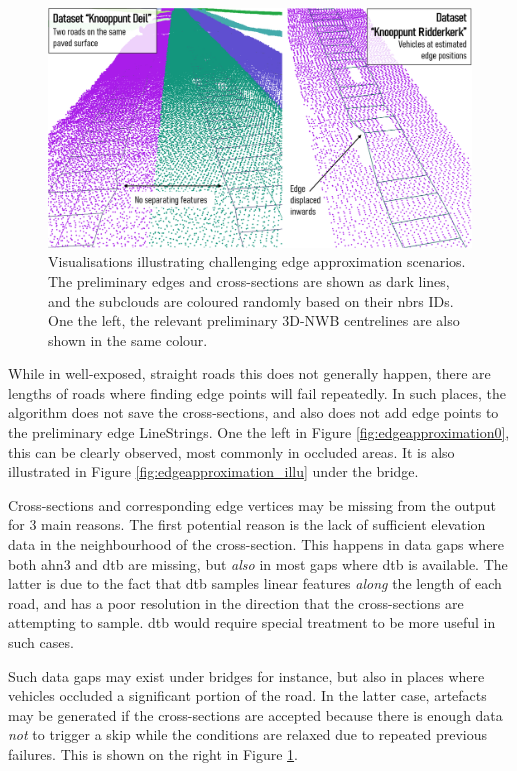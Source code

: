 \begin{figure}
    \centering
    \includegraphics[width=\linewidth]{final_report/figs/edgeapproximation1.png}
    \caption[Renders illustrating challenging edge approximation scenarios]{Visualisations illustrating challenging edge approximation scenarios. The preliminary edges and cross-sections are shown as dark lines, and the subclouds are coloured randomly based on their \ac{nbrs} IDs. One the left, the relevant preliminary 3D-NWB centrelines are also shown in the same colour.}
    \label{fig:edgeapproximation1}
\end{figure}

While in well-exposed, straight roads this does not generally happen, there are lengths of roads where finding edge points will fail repeatedly. In such places, the algorithm does not save the cross-sections, and also does not add edge points to the preliminary edge LineStrings. One the left in Figure \ref{fig:edgeapproximation0}, this can be clearly observed, most commonly in occluded areas. It is also illustrated in Figure \ref{fig:edgeapproximation_illu} under the bridge.

Cross-sections and corresponding edge vertices may be missing from the output for 3 main reasons. The first potential reason is the lack of sufficient elevation data in the neighbourhood of the cross-section. This happens in data gaps where both \ac{ahn3} and \ac{dtb} are missing, but \textit{also} in most gaps where \ac{dtb} is available. The latter is due to the fact that \ac{dtb} samples linear features \textit{along} the length of each road, and has a poor resolution in the direction that the cross-sections are attempting to sample. \ac{dtb} would require special treatment to be more useful in such cases.

Such data gaps may exist under bridges for instance, but also in places where vehicles occluded a significant portion of the road. In the latter case, artefacts may be generated if the cross-sections are accepted because there is enough data \textit{not} to trigger a skip while the conditions are relaxed due to repeated previous failures. This is shown on the right in Figure \ref{fig:edgeapproximation1}.

